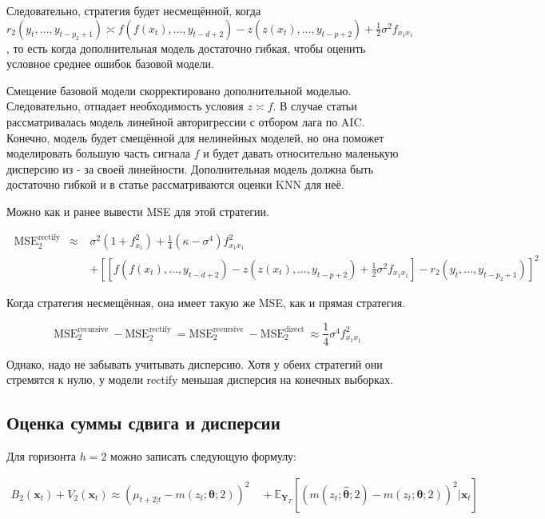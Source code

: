 \documentclass[a4paper,12pt]{article}
\begin{document}
Следовательно, стратегия будет несмещённой, когда $ r_{2}\left(y_{t}, \ldots, y_{t-p_{2}+1}\right) \asymp f\left(f\left(x_{t}\right), \ldots, y_{t-d+2}\right)-z\left(z\left(x_{t}\right), \ldots, y_{t-p+2}\right)+\frac{1}{2} \sigma^{2} f_{x_{1} x_{1}} $, то есть когда дополнительная модель достаточно гибкая, чтобы оценить условное среднее ошибок базовой модели.

Смещение базовой модели скорректировано дополнительной моделью. Следовательно, отпадает необходимость условия $ z \asymp f $. В случае статьи рассматривалась модель линейной авторигрессии с отбором лага по AIC. Конечно, модель будет смещённой  для нелинейных моделей, но она поможет моделировать большую часть сигнала $ f $ и будет давать относительно маленькую дисперсию из - за своей линейности. Дополнительная модель должна быть достаточно гибкой и в статье рассматриваются оценки KNN для неё.

Можно как и ранее вывести MSE для этой стратегии.

\[
\begin{aligned} \operatorname{MSE}_{2}^{\text {rectify }} \approx & \sigma^{2}\left(1+f_{x_{1}}^{2}\right)+\frac{1}{4}\left(\kappa-\sigma^{4}\right) f_{x_{1} x_{1}}^{2} \\ &+\left[\left[f\left(f\left(x_{t}\right), \ldots, y_{t-d+2}\right)-z\left(z\left(x_{t}\right), \ldots, y_{t-p+2}\right)+\frac{1}{2} \sigma^{2} f_{x_{1} x_{1}}\right]-r_{2}\left(y_{t}, \ldots, y_{t-p_{2}+1}\right)\right]^{2} \end{aligned}
\]

Когда стратегия несмещённая, она имеет такую же MSE, как и прямая стратегия.

\[
\mathrm{MSE}_{2}^{\text {recursive }}-\mathrm{MSE}_{2}^{\text {rectify }}=\mathrm{MSE}_{2}^{\text {recursive }}-\mathrm{MSE}_{2}^{\text {direct }} \approx \frac{1}{4} \sigma^{4} f_{x_{1} x_{1}}^{2}
\]

Однако, надо не забывать учитывать дисперсию. Хотя у обеих стратегий они стремятся к нулю, у модели rectify меньшая дисперсия на конечных выборках.

\subsection{Оценка суммы сдвига и дисперсии}

Для горизонта $ h=2 $ можно записать следующую формулу:

\[
\begin{array}{l}{B_{2}\left(\boldsymbol{x}_{t}\right)+V_{2}\left(\boldsymbol{x}_{t}\right)}  {\approx\left(\mu_{t+2 | t}-m\left(z_{t} ; \boldsymbol{\theta} ; 2\right)\right)^{2}} {\quad + \mathbb{E}_{\boldsymbol{Y}_{T}}\left[\left(m\left(z_{t} ; \hat{\boldsymbol{\theta}} ; 2\right)-m\left(z_{t} ; \boldsymbol{\theta} ; 2\right)\right)^{2} | \boldsymbol{x}_{t}\right]}\end{array}
\]
\end{document}
